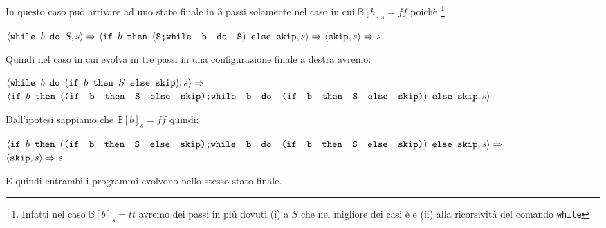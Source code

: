 {	 In questo caso  può arrivare ad uno stato finale
	in 3 passi solamente nel caso in cui $\mathbb{B}[b]_s=ff$ poichè
	\footnote{Infatti nel caso $\mathbb{B}[b]_s=tt$ avremo dei passi in più 
	dovuti (i) a $S$ che nel migliore dei casi è \skipistr{} e (ii) alla
	ricorsività del comando \texttt{while}}
	\begin{center}
	$\confSs{\wbS{b}{S}}{s}\Rar{}
	\confSs{
		\ifABC{b}
			{(\concat{S}{\wbS{b}{S}})}
			{\skipistr}
	}{s}\Rar{}
	\confSs{\skipistr}{s}\Rar{}s$
	\end{center}
	Quindi nel caso in cui  evolva in tre passi in una
	configurazione finale a destra avremo:
	\begin{center}
	$\confSs{\wbS{b}{(\ifABC{b}{S}{\skipistr})}}{s}\Rar{}$\\
	{\small
	$\confSs{
		\ifABC{b}
		{(\concat{(\ifABC{b}{S}{\skipistr})}
		{\wbS{b}{(\ifABC{b}{S}{\skipistr})}})}
		{\skipistr}
	}{s}$}
	\end{center}
	Dall'ipotesi sappiamo che $\mathbb{B}[b]_s=ff$ quindi:
	\begin{center}
	{\small
	$\confSs{
		\ifABC{b}
		{(\concat{(\ifABC{b}{S}{\skipistr})}
		{\wbS{b}{(\ifABC{b}{S}{\skipistr})}})}
		{\skipistr}
	}{s}\Rar{}$} \\
	$\confSs{\skipistr}{s}\Rar{}{s}$
	\end{center}
	E quindi entrambi i programmi evolvono nello stesso stato finale.\\

}
